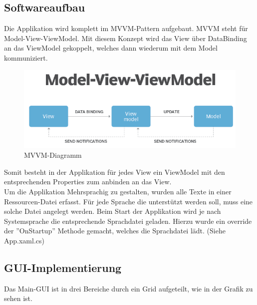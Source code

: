 \subsection{Softwareaufbau}
Die Applikation wird komplett im MVVM-Pattern aufgebaut. MVVM steht für Model-View-ViewModel. Mit diesem Konzept wird das View über DataBinding an das ViewModel gekoppelt, welches dann wiederum mit dem Model kommuniziert. 

\begin{figure}[H]
  \begin{center}
    \includegraphics[width=0.6\linewidth]{content/images/mvvm.png}
    \caption{MVVM-Diagramm}
    \label{mvvm}
  \end{center}
\end{figure}

Somit besteht in der Applikation für jedes View ein ViewModel mit den entsprechenden Properties zum anbinden an das View.\\
Um die Applikation Mehrsprachig zu gestalten, wurden alle Texte in einer Ressourcen-Datei erfasst. Für jede Sprache die unterstützt werden soll, muss eine solche Datei angelegt werden. Beim Start der Applikation wird je nach Systemsprache die entsprechende Sprachdatei geladen. Hierzu wurde ein override der ''OnStartup'' Methode gemacht, welches die Sprachdatei lädt. (Siehe App.xaml.cs)



\subsection{GUI-Implementierung}
Das Main-GUI ist in drei Bereiche durch ein Grid aufgeteilt, wie in der Grafik  zu sehen ist.

